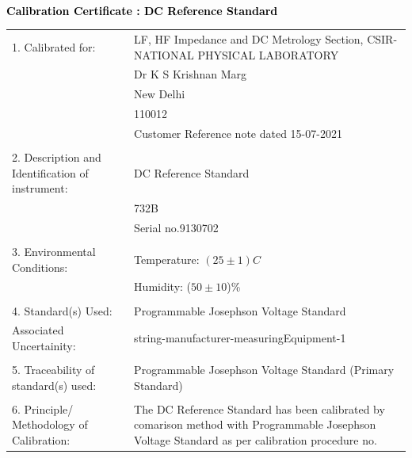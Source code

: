 \documentclass[a4paper]{article}
\begin{document}
            \begin{center}
                {\fontsize{18pt}{20pt}\selectfont\textbf{\textcolor{black}{\\[3pt]Calibration Certificate : DC Reference Standard}}}
            \end{center}
            
            \vspace{2cm}  %
            
            \renewcommand{\arraystretch}{1.5} %
            
            \begin{center}
                \setlength{\tabcolsep}{12pt} %
                \begin{tabularx}{\textwidth}{@{\extracolsep{8pt}} p{} X}  %
                    1. Calibrated for: & LF, HF Impedance and DC Metrology Section, CSIR-NATIONAL PHYSICAL LABORATORY \\
                    & Dr K S Krishnan Marg \\
                    & New Delhi \\
                    & 110012 \\
                    & Customer Reference note dated 15-07-2021 \\
                    &  \\
                    2. Description and Identification of instrument: & DC Reference Standard \\
                    & 732B \\
                    & Serial no.9130702 \\
                    & \\
                    3. Environmental Conditions:
                    & Temperature: {$(25\pm1)C$} \\
                    & Humidity: ({$50\pm10$})\% \\ 
                    & \\
                    4. Standard(s) Used: & Programmable Josephson Voltage Standard \\
                    Associated Uncertainity: & string-manufacturer-measuringEquipment-1 \\
                    & \\
                    5. Traceability of standard(s) used: & Programmable Josephson Voltage Standard (Primary Standard)\\
                    & \\
                    6. Principle/ Methodology of Calibration: & The DC Reference Standard has been calibrated by comarison method with Programmable Josephson Voltage Standard as per calibration procedure no. \\
                \end{tabularx}
            \end{center}
\end{document}
